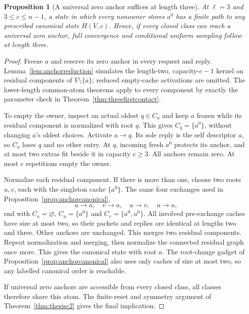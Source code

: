 \documentclass[11pt]{article}
\newtheorem{proposition}[theorem]{Proposition}
\begin{document}
\begin{proposition}[A universal zero anchor suffices at length three]
\label{prop:threezeroanchor}
At $\ell=3$ and $3\le c\le n-1$, a state in which every
nonowner stores $a^0$ has a finite path to any prescribed
canonical state $H(V,c)$. Hence, if every closed class
can reach a universal zero anchor, full convergence and
conditional uniform sampling follow at length three.
\end{proposition}
\begin{proof}
Freeze $a$ and reserve its zero anchor in every request
and reply. Lemma~\ref{lem:anchorreduction} simulates
the length-two, capacity-$c-1$ kernel on residual
components of $V\setminus\{a\}$; reduced empty-cache
activations are omitted. The lower-length common-atom
theorems apply to every component by exactly the
parameter check in Theorem~\ref{thm:threefirstcontact}.

To empty the owner, inspect an actual oldest $q\in C_a$
and keep $a$ frozen while its residual component is
normalized with root $q$. This gives $C_q=\{a^0\}$,
without changing $a$'s oldest choices. Activate $a\to q$.
Its sole reply is the self descriptor $a$, so $C_a$
loses $q$ and no other entry. At $q$, incoming fresh
$a^0$ protects its anchor, and at most two extras fit
beside it in capacity $c\ge3$. All anchors remain zero.
At most $c$ repetitions empty the owner.

Normalize each residual component. If there is more
than one, choose two roots $u,v$, each with the singleton
cache $\{a^0\}$. The same four exchanges used in
Proposition~\ref{prop:anchorcanonical},
\[
 u\to a,\quad v\to a,\quad a\to v,\quad a\to u,
\]
end with $C_a=\varnothing$, $C_u=\{a^0\}$ and
$C_v=\{a^0,u^0\}$. All involved pre-exchange caches
have size at most two, so their packets and replies
are identical at lengths two and three. Other anchors
are unchanged. This merges two residual components.
Repeat normalization and merging, then normalize the
connected residual graph once more. This gives the
canonical state with root $a$. The root-change gadget
of Proposition~\ref{prop:anchorcanonical} also uses
only caches of size at most two, so any labelled
canonical order is reachable.

If universal zero anchors are accessible from every
closed class, all classes therefore share this atom.
The finite-reset and symmetry argument of
Theorem~\ref{thm:thesisc2} gives the final implication.
\end{proof}
\end{document}
